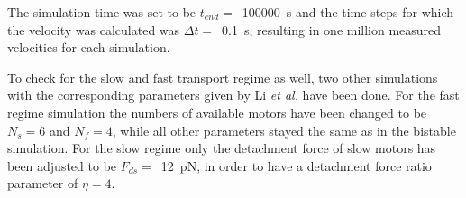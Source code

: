 The simulation time was set to be \mbox{$t_{end} =$ \SI{100000}{\second}} and the time steps for which the velocity was calculated was \mbox{$\Delta t =$ \SI{0.1}{\second}}, resulting in one 
million measured velocities for each simulation.

To check for the slow and fast transport regime as well, two other simulations with the corresponding parameters given by Li \textit{et al.} \cite{li} have been done. For the fast regime
simulation the numbers of available motors have been changed to be \mbox{$N_s = 6$} and \mbox{$N_f = 4$}, while all other parameters stayed the same as in the bistable simulation. For the slow
regime only the detachment force of slow motors has been adjusted to be \mbox{$F_{ds} =$ \SI{12}{\pico\newton}}, in order to have a detachment force ratio parameter of \mbox{$\eta = 4$}. \\


